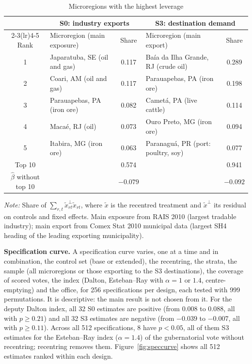 \documentclass[
	11pt,				%
	oneside,			%
	a4paper,			%
	english,			%
	english				%
	]{abntex2ppgsi}
\theoremstyle{plain}
\theoremstyle{remark}
\theoremstyle{plain}%
\theoremstyle{remark}%
\begin{document}
\begin{table}[!htbp]
\centering
\caption{Microregions with the highest leverage}
\label{tab:leverage}
\begin{threeparttable}
\small
\begin{tabular*}{\textwidth}{@{\extracolsep{\fill}}clclc@{}}
\toprule
 & \multicolumn{2}{c}{S0: industry exports} & \multicolumn{2}{c}{S3: destination demand} \\
\cmidrule(lr){2-3}\cmidrule(lr){4-5}
Rank & Microregion (main exposure) & Share & Microregion (main export) & Share \\
\midrule
1 & Japaratuba, SE (oil and gas) & 0.117 & Baía da Ilha Grande, RJ (crude oil) & 0.289 \\
2 & Coari, AM (oil and gas) & 0.117 & Parauapebas, PA (iron ore) & 0.198 \\
3 & Parauapebas, PA (iron ore) & 0.082 & Cametá, PA (live cattle) & 0.114 \\
4 & Macaé, RJ (oil) & 0.073 & Ouro Preto, MG (iron ore) & 0.094 \\
5 & Itabira, MG (iron ore) & 0.063 & Paranaguá, PR (port: poultry, soy) & 0.077 \\
\addlinespace
Top 10 & & 0.574 & & 0.941 \\
$\hat\beta$ without top 10 & & $-0.079$ & & $-0.092$ \\
\bottomrule
\end{tabular*}
\begin{tablenotes}[flushleft]
\footnotesize
\item \textit{Note:} Share of $\sum_{r,t} \tilde{x}^{\perp}_{rt}\tilde{x}_{rt}$, where $\tilde{x}$ is the recentred treatment and $\tilde{x}^{\perp}$ its residual on controls and fixed effects. Main exposure from RAIS 2010 (largest tradable industry); main export from Comex Stat 2010 municipal data (largest SH4 heading of the leading exporting municipality).
\end{tablenotes}
\end{threeparttable}
\end{table}

\textbf{Specification curve.} A specification curve varies, one at a time and in combination, the control set (base or extended), the recentring, the strata, the sample (all microregions or those exporting to the S3 destinations), the coverage of scored votes, the index (Dalton, Esteban--Ray with $\alpha = 1$ or $1.4$, centre-emptying) and the office, for 256 specifications per design, each tested with 999 permutations. It is descriptive: the main result is not chosen from it. For the deputy Dalton index, all 32 S0 estimates are positive (from $0.008$ to $0.088$, all with $p \geq 0.21$) and all 32 S3 estimates are negative (from $-0.039$ to $-0.007$, all with $p \geq 0.11$). Across all 512 specifications, 8 have $p < 0.05$, all of them S3 estimates for the Esteban--Ray index ($\alpha = 1.4$) of the gubernatorial vote without recentring; recentring removes them.
Figure~\ref{fig:speccurve} shows all 512 estimates ranked within each design.
\end{document}
